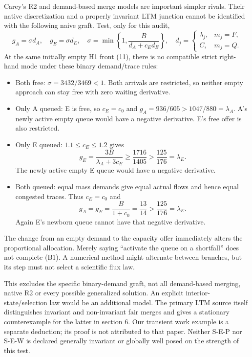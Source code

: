 \documentclass[11pt,a4paper]{article}
\begin{document}
Carey's R2 and demand-based merge models are important simpler rivals.
Their native discretization and a properly invariant LTM junction cannot
be identified with the following naive graft. Test, only for this audit,
\begin{equation}
 g_A=\sigma d_A,\quad g_E=\sigma d_E,\quad
 \sigma=\min\!\left\{1,\frac{B}{d_A+c_Ed_E}\right\},\quad
 d_j=\begin{cases}\lambda_j,&m_j=F,\\ C,&m_j=Q.\end{cases} \tag{B1}
\end{equation}
At the same initially empty H1 front (11), there is no compatible strict
right-hand mode under these binary demand/trace rules:
\begin{itemize}
\item Both free: $\sigma=3432/3469<1$. Both arrivals are restricted,
so neither empty approach can stay free with zero waiting derivative.
\item Only A queued: E is free, so $c_E=c_0$ and
$g_A=936/605>1047/880=\lambda_A$. A's newly active empty queue would
have a negative derivative. E's free offer is also restricted.
\item Only E queued: $1.1\leq c_E\leq1.2$ gives
\begin{equation}
 g_E=\frac{3B}{\lambda_A+3c_E}
       \geq\frac{1716}{1405}>\frac{125}{176}=\lambda_E. \tag{B2}
\end{equation}
The newly active empty E queue would have a negative derivative.
\item Both queued: equal mass demands give equal actual flows and hence
equal congested traces. Thus $c_E=c_0$ and
\begin{equation}
 g_A=g_E=\frac{B}{1+c_0}=\frac{13}{14}
                   >\frac{125}{176}=\lambda_E. \tag{B3}
\end{equation}
Again E's newborn queue cannot have that negative derivative.
\end{itemize}
The change from an empty demand to the capacity offer immediately alters
the proportional allocation. Merely saying ``activate the queue on a
shortfall'' does not complete (B1). A numerical method might alternate
between branches, but its step must not select a scientific flux law.

This excludes the specific binary-demand graft, not all demand-based
merging, native R2 or every possible generalized solution. An explicit
interior-state/selection law would be an additional model. The primary
LTM source itself distinguishes invariant and non-invariant fair merges
and gives a stationary counterexample for the latter in section 6.
Our transient work example is a separate deduction; its proof is not
attributed to that paper. Neither S-E-P nor S-E-W is declared generally
invariant or globally well posed on the strength of this test.
\end{document}
